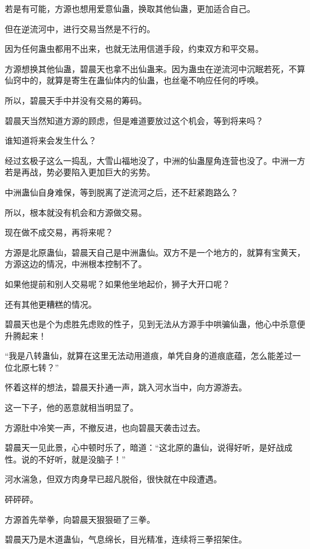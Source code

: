 
\begin{this_body}

若是有可能，方源也想用爱意仙蛊，换取其他仙蛊，更加适合自己。

但在逆流河中，进行交易当然是不行的。

因为任何蛊虫都用不出来，也就无法用信道手段，约束双方和平交易。

方源想换其他仙蛊，碧晨天也拿不出仙蛊来。因为蛊虫在逆流河中沉眠若死，不算仙窍中的，就算是寄生在蛊仙体内的仙蛊，也丝毫不响应任何的呼唤。

所以，碧晨天手中并没有交易的筹码。

碧晨天当然知道方源的顾虑，但是难道要放过这个机会，等到将来吗？

谁知道将来会发生什么？

经过玄极子这么一捣乱，大雪山福地没了，中洲的仙蛊屋角连营也没了。中洲一方若是再战，势必要陷入更加巨大的劣势。

中洲蛊仙自身难保，等到脱离了逆流河之后，还不赶紧跑路么？

所以，根本就没有机会和方源做交易。

现在做不成交易，再将来呢？

方源是北原蛊仙，碧晨天自己是中洲蛊仙。双方不是一个地方的，就算有宝黄天，方源这边的情况，中洲根本控制不了。

如果他提前和别人交易呢？如果他坐地起价，狮子大开口呢？

还有其他更糟糕的情况。

碧晨天也是个为虑胜先虑败的性子，见到无法从方源手中哄骗仙蛊，他心中杀意便升腾起来！

“我是八转蛊仙，就算在这里无法动用道痕，单凭自身的道痕底蕴，怎么能差过一位北原七转？”

怀着这样的想法，碧晨天扑通一声，跳入河水当中，向方源游去。

这一下子，他的恶意就相当明显了。

方源肚中冷笑一声，不撤反进，也向碧晨天袭击过去。

碧晨天一见此景，心中顿时乐了，暗道：“这北原的蛊仙，说得好听，是好战成性。说的不好听，就是没脑子！”

河水湍急，但双方肉身早已超凡脱俗，很快就在中段遭遇。

砰砰砰。

方源首先举拳，向碧晨天狠狠砸了三拳。

碧晨天乃是木道蛊仙，气息绵长，目光精准，连续将三拳招架住。


\end{this_body}

